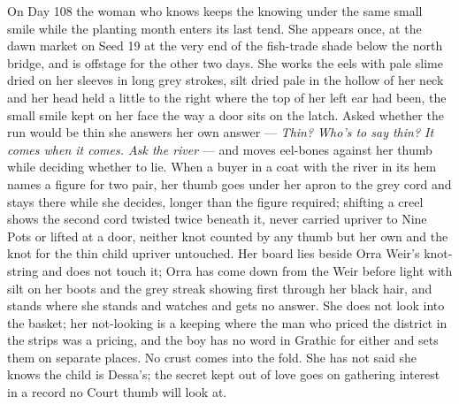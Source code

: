 \documentclass{design/chronicle}
\begin{document}
{On Day 108 the woman who knows keeps the knowing under the same small smile while the planting month enters its last tend. She appears once, at the dawn market on Seed 19 at the very end of the fish-trade shade below the north bridge, and is offstage for the other two days. She works the eels with pale slime dried on her sleeves in long grey strokes, silt dried pale in the hollow of her neck and her head held a little to the right where the top of her left ear had been, the small smile kept on her face the way a door sits on the latch. Asked whether the run would be thin she answers her own answer — \emph{Thin? Who’s to say thin? It comes when it comes. Ask the river} — and moves eel-bones against her thumb while deciding whether to lie. When a buyer in a coat with the river in its hem names a figure for two pair, her thumb goes under her apron to the grey cord and stays there while she decides, longer than the figure required; shifting a creel shows the second cord twisted twice beneath it, never carried upriver to Nine Pots or lifted at a door, neither knot counted by any thumb but her own and the knot for the thin child upriver untouched. Her board lies beside Orra Weir’s knot-string and does not touch it; Orra has come down from the Weir before light with silt on her boots and the grey streak showing first through her black hair, and stands where she stands and watches and gets no answer. She does not look into the basket; her not-looking is a keeping where the man who priced the district in the strips was a pricing, and the boy has no word in Grathic for either and sets them on separate places. No crust comes into the fold. She has not said she knows the child is Dessa’s; the secret kept out of love goes on gathering interest in a record no Court thumb will look at.

}
\end{document}
